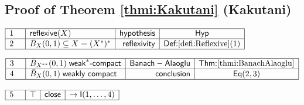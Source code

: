 \documentclass[11pt,reqno]{amsart}
\begin{document}
	\subsection*{Proof of Theorem \protect\ref{thmi:Kakutani} (\textsf{Kakutani})}
	\noindent$\begin{array}{|m{0.5cm}|l|r|c|}
	\hline
	1 & \mathsf{reflexive}(X) & \mathsf{hypothesis} & \mathsf{Hyp} \\ \hline
	2 & \bar{B}_{X}(0,1)\subseteq X=(X^{*})^{*} & \mathsf{reflexivity} & \textsf{Def:}\ref{defi:Reflexive}(1) \\ \hline
	\end{array}$
	\par\nointerlineskip\noindent$\begin{array}{|m{0.5cm}|l|r|c|}
	\hline
	3 & \bar{B}_{X^{**}}(0,1)\;\mathsf{weak}^{\ast}\text{-}\mathsf{compact} & \mathsf{Banach-Alaoglu} & \textsf{Thm:}\ref{thmi:BanachAlaoglu} \\ \hline
	4 & \bar{B}_{X}(0,1)\;\mathsf{weakly\ compact} & \mathsf{conclusion} & \mathsf{Eq}(2,3) \\ \hline
	\end{array}$
	\par\nointerlineskip\noindent$\begin{array}{|m{0.5cm}|l|r|c|}
	\hline
	5 & \top & \mathsf{close} & \to\mathsf{I}(1,\dots,4) \\ \hline
	\end{array}$
	\medskip
	
\end{document}
